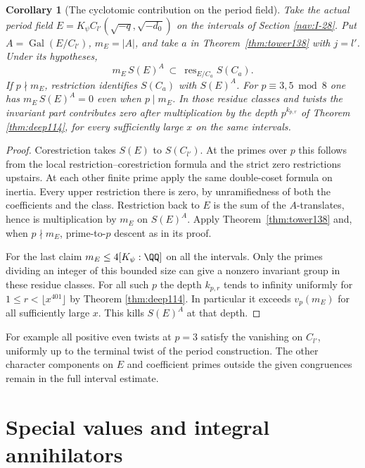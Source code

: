 \documentclass[a4paper,11pt]{article}
\newtheorem{corollary}[proposition]{Corollary}
\theoremstyle{definition}
\theoremstyle{remark}
\numberwithin{equation}{section}
\begin{document}
\begin{corollary}[The cyclotomic contribution on the period field]
\label{cor:descent138}
Take the actual period field
\(E=K_\psi C_{l'}(\sqrt{-q},\sqrt{-d_0})\) on the intervals of
Section \ref{nav:I-28}. Put \(A=\operatorname{Gal}(E/C_{l'})\),
\(m_E=|A|\), and take \(a\) in Theorem~\ref{thm:tower138} with
\(j=l'\). Under its hypotheses,
\[
      m_E\, S(E)^A\ \subset\ \operatorname{res}_{E/C_a}S(C_a).
\]
If \(p\nmid m_E\), restriction identifies \(S(C_a)\) with
\(S(E)^A\). For \(p\equiv3,5\bmod8\) one has
\(m_E\, S(E)^A=0\) even when \(p\mid m_E\). In those residue
classes and twists the invariant part contributes zero after
multiplication by the depth \(p^{k_{p,r}}\) of Theorem \ref{thm:deep114}, for every sufficiently large \(x\) on the same
intervals.
\end{corollary}
\begin{proof}
Corestriction takes \(S(E)\) to \(S(C_{l'})\). At the primes
over \(p\) this follows from the local restriction--corestriction
formula and the strict zero restrictions upstairs. At each other
finite prime apply the same double-coset formula on inertia.
Every upper restriction there is zero, by unramifiedness of
both the coefficients and the class. Restriction back to \(E\)
is the sum of the \(A\)-translates, hence is multiplication by
\(m_E\) on \(S(E)^A\). Apply Theorem~\ref{thm:tower138} and,
when \(p\nmid m_E\), prime-to-\(p\) descent as in its proof.

For the last claim \(m_E\le 4[K_\psi:\QQ]\) on all the intervals.
Only the primes dividing an integer of this bounded size can
give a nonzero invariant group in these residue classes.
For all such \(p\) the depth \(k_{p,r}\) tends to infinity
uniformly for \(1\le r<\lfloor x^{401}\rfloor\) by Theorem \ref{thm:deep114}. In particular it exceeds \(v_p(m_E)\) for all
sufficiently large \(x\). This kills \(S(E)^A\) at that depth.
\end{proof}

For example all positive even twists at \(p=3\) satisfy the
vanishing on \(C_{l'}\), uniformly up to the terminal twist
of the period construction. The other character components
on \(E\) and coefficient primes outside the given congruences
remain in the full interval estimate.

\section{Special values and integral annihilators}\label{nav:g-III-1}
\end{document}
